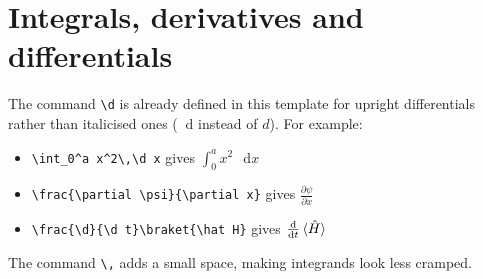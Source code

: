 \documentclass[12pt]{article}
\renewcommand{\d}{\mathop{}\!\mathrm{d}}
\begin{document}
\section{Integrals, derivatives and differentials}
The command \verb|\d| is already defined in this template for upright differentials rather than italicised ones ($\d$ instead of $d$). For example:
\begin{itemize}
\item \verb|\int_0^a x^2\,\d x| gives $\int_0^a x^2\,\d x$
\item \verb|\frac{\partial \psi}{\partial x}| gives $\frac{\partial \psi}{\partial x}$
\item \verb|\frac{\d}{\d t}\braket{\hat H}| gives $\frac{\d}{\d t}\braket{\hat H}$
\end{itemize}
The command \verb|\,| adds a small space, making integrands look less cramped.
\end{document}
